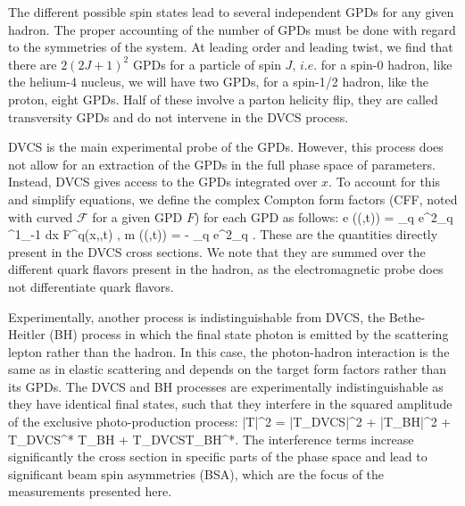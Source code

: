 \documentclass{article}
\let\oldequation\equation
\let\oldendequation\endequation
\renewenvironment{equation}
  {\linenomathNonumbers\oldequation}
  {\oldendequation\endlinenomath}
\begin{document}
The different possible spin states lead to several independent GPDs for any 
given hadron. The proper accounting of the number of GPDs must be done with 
regard to the symmetries of the system. At leading order and leading twist, we 
find that there are $2(2J+1)^2$ GPDs for a particle of spin $J$, 
$i.e.$ for a spin-0 hadron, like the helium-4 nucleus, we will have two GPDs, 
for a spin-1/2 hadron, like the proton, eight GPDs. Half of these involve a 
parton helicity flip, they are called transversity GPDs and do not intervene 
in the DVCS process. 

DVCS is the main experimental probe of the GPDs. However, this process does not allow
for an extraction of the GPDs in the full phase space of parameters. Instead, DVCS gives access
to the GPDs integrated over $x$. 
To account for this and simplify equations, we define the complex Compton form factors (CFF,
noted with curved $\mathcal{F}$ for a given GPD $F$) for each GPD as follows:
\begin{equation}
\Re e ((\xi,t)) = \sum _q e^2_q  \int^1_{-1} dx F^{q}(x,\xi,t)
    , 
\end{equation}
\begin{equation}
\Im m ((\xi,t)) = - \pi \sum _q e^2_q \left [ F^{q}(\xi,\xi,t) \mp F^{q}(-\xi,\xi,t) \right]. 
\end{equation} 
These are the quantities directly present in the DVCS cross sections. We note that they are summed over
the different quark flavors present in the hadron, as the electromagnetic probe does not differentiate
quark flavors.

Experimentally, another process is indistinguishable from DVCS, the Bethe-Heitler (BH) 
process in which 
the final state photon is emitted by the scattering lepton rather than the hadron. In this case, the 
photon-hadron interaction is the same as in elastic scattering and depends on the
target form factors rather than its GPDs. The DVCS and BH processes are experimentally 
indistinguishable as they
have identical final states, such that they interfere in the squared amplitude of the
exclusive photo-production process:
\begin{equation}
|T|^2 = |T_{DVCS}|^2 + |T_{BH}|^2 + T_{DVCS}^* T_{BH} + T_{DVCS}T_{BH}^*. 
\end{equation}
The interference terms increase significantly the cross section in specific parts of the phase space
and lead to significant beam spin asymmetries (BSA), which are the focus of the measurements presented 
here. 
\end{document}
